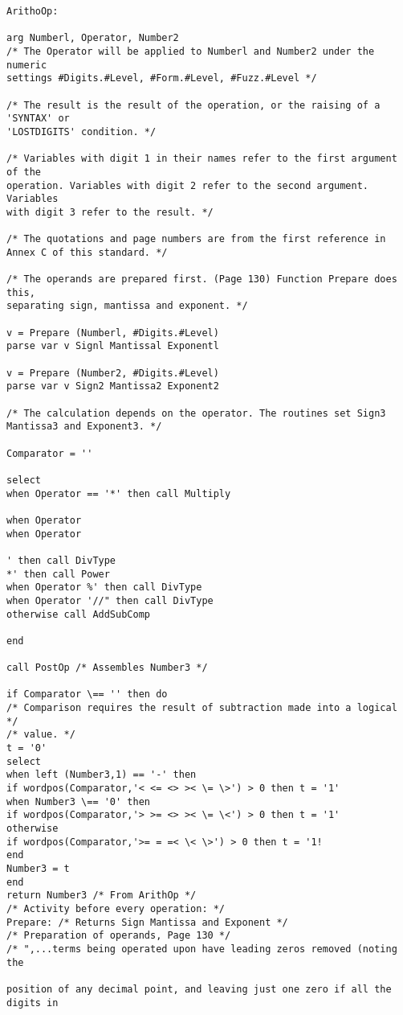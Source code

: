\begin{verbatim}
ArithoOp:

arg Numberl, Operator, Number2
/* The Operator will be applied to Numberl and Number2 under the numeric
settings #Digits.#Level, #Form.#Level, #Fuzz.#Level */

/* The result is the result of the operation, or the raising of a 'SYNTAX' or
'LOSTDIGITS' condition. */

/* Variables with digit 1 in their names refer to the first argument of the
operation. Variables with digit 2 refer to the second argument. Variables
with digit 3 refer to the result. */

/* The quotations and page numbers are from the first reference in
Annex C of this standard. */

/* The operands are prepared first. (Page 130) Function Prepare does this,
separating sign, mantissa and exponent. */

v = Prepare (Numberl, #Digits.#Level)
parse var v Signl Mantissal Exponentl

v = Prepare (Number2, #Digits.#Level)
parse var v Sign2 Mantissa2 Exponent2

/* The calculation depends on the operator. The routines set Sign3
Mantissa3 and Exponent3. */

Comparator = ''

select
when Operator == '*' then call Multiply

when Operator
when Operator

' then call DivType
*' then call Power
when Operator %' then call DivType
when Operator '//" then call DivType
otherwise call AddSubComp

end

call PostOp /* Assembles Number3 */

if Comparator \== '' then do
/* Comparison requires the result of subtraction made into a logical */
/* value. */
t = '0'
select
when left (Number3,1) == '-' then
if wordpos(Comparator,'< <= <> >< \= \>') > 0 then t = '1'
when Number3 \== '0' then
if wordpos(Comparator,'> >= <> >< \= \<') > 0 then t = '1'
otherwise
if wordpos(Comparator,'>= = =< \< \>') > 0 then t = '1!
end
Number3 = t
end
return Number3 /* From ArithOp */
/* Activity before every operation: */
Prepare: /* Returns Sign Mantissa and Exponent */
/* Preparation of operands, Page 130 */
/* ",...terms being operated upon have leading zeros removed (noting the

position of any decimal point, and leaving just one zero if all the digits in


\end{verbatim}
